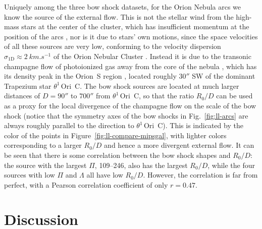 \documentclass[useAMS, usenatbib, a4paper]{mnras}
\newcommand{\thC}{\(\theta^1\)\,Ori~C}
\begin{document}
Uniquely among the three bow shock datasets, for the Orion Nebula arcs
we know the source of the external flow.  This is not the stellar wind
from the high-mass stars at the center of the cluster, which has
insufficient momentum at the position of the arcs \citep{Bally:2000a},
nor is it due to stars' own motions, since the space velocities of all
these sources are very low, conforming to the velocity dispersion
\(\sigma_{\text{1D}} \approx \SI{2}{km.s^{-1}}\) of the Orion Nebular Cluster
\citep{Dzib:2017a, Kim:2018b}.  Instead it is due to the transonic
champagne flow of photoionized gas away from the core of the nebula
\citep{Zuckerman:1973a, Henney:2005a}, which has its density peak in
the Orion~S region \citep{Weilbacher:2015a}, located roughly \(30''\)
SW of the dominant Trapezium star \thC.  The bow shock sources are
located at much larger distances of \(D = 90''\) to \(700''\) from
\thC, so that the ratio \(R_0/D\) can be used as a proxy for the local
divergence of the champagne flow on the scale of the bow shock (notice
that the symmetry axes of the bow shocks in Fig.~\ref{fig:ll-arcs} are
always roughly parallel to the direction to \thC{}).  This is
indicated by the color of the points in
Figure~\ref{fig:ll-compare-mipsgal}, with lighter colors corresponding
to a larger \(R_0/D\) and hence a more divergent external flow.  It
can be seen that there is some correlation between the bow shock
shapes and \(R_0/D\): the source with the largest \(\Pi\), 109--246, also
has the largest \(R_0/D\), while the four sources with low \(\Pi\) and
\(\Lambda\) all have low \(R_0/D\).  However, the correlation is far from
perfect, with a Pearson correlation coefficient of only \(r = 0.47\).




\section{Discussion}
\label{sec:discussion}
\end{document}
